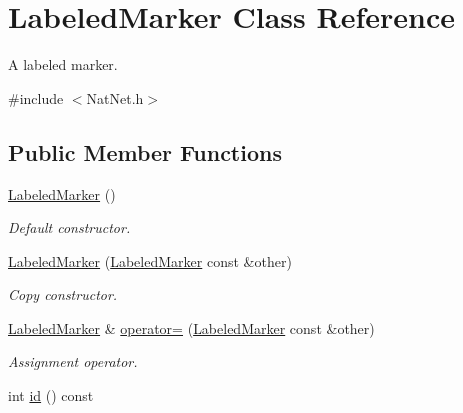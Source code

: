\hypertarget{classLabeledMarker}{\section{\-Labeled\-Marker \-Class \-Reference}
\label{classLabeledMarker}
}


\-A labeled marker.  




{\ttfamily \#include $<$\-Nat\-Net.\-h$>$}

\subsection*{\-Public \-Member \-Functions}
\begin{DoxyCompactItemize}
\item 
\hypertarget{classLabeledMarker_ad5b6b60859240da85464c4484cb1e01b}{\hyperlink{classLabeledMarker_ad5b6b60859240da85464c4484cb1e01b}{\-Labeled\-Marker} ()}\label{classLabeledMarker_ad5b6b60859240da85464c4484cb1e01b}

\begin{DoxyCompactList}\small\item\em \-Default constructor. \end{DoxyCompactList}\item 
\hypertarget{classLabeledMarker_aff0e96d4b4807eb08048a1465cf9b90a}{\hyperlink{classLabeledMarker_aff0e96d4b4807eb08048a1465cf9b90a}{\-Labeled\-Marker} (\hyperlink{classLabeledMarker}{\-Labeled\-Marker} const \&other)}\label{classLabeledMarker_aff0e96d4b4807eb08048a1465cf9b90a}

\begin{DoxyCompactList}\small\item\em \-Copy constructor. \end{DoxyCompactList}\item 
\hypertarget{classLabeledMarker_ac5292b69ae6bd6f2ed2d4fd62c0977ea}{\hyperlink{classLabeledMarker}{\-Labeled\-Marker} \& \hyperlink{classLabeledMarker_ac5292b69ae6bd6f2ed2d4fd62c0977ea}{operator=} (\hyperlink{classLabeledMarker}{\-Labeled\-Marker} const \&other)}\label{classLabeledMarker_ac5292b69ae6bd6f2ed2d4fd62c0977ea}

\begin{DoxyCompactList}\small\item\em \-Assignment operator. \end{DoxyCompactList}\item 
\hypertarget{classLabeledMarker_a1a91ca530b84e9c23ee0d8b21ab6a455}{int \hyperlink{classLabeledMarker_a1a91ca530b84e9c23ee0d8b21ab6a455}{id} () const }\label{classLabeledMarker_a1a91ca530b84e9c23ee0d8b21ab6a455}


\end{DoxyCompactItemize}
